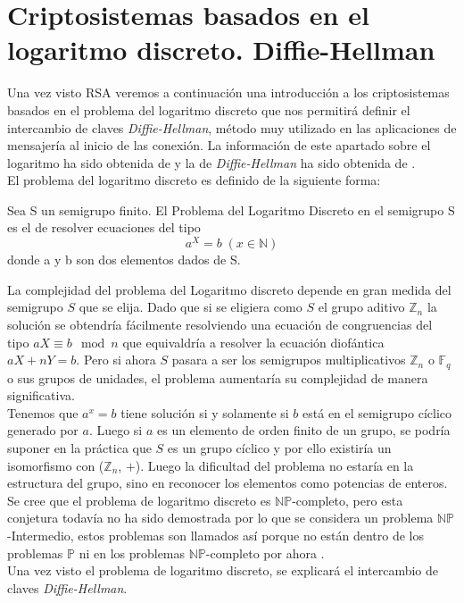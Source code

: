\section{Criptosistemas basados en el logaritmo discreto. Diffie-Hellman}
Una vez visto RSA veremos a continuación una introducción a los criptosistemas basados en el problema del logaritmo discreto que nos permitirá definir el intercambio de claves \emph{Diffie-Hellman}, método muy utilizado en las aplicaciones de mensajería al inicio de las conexión. La información de este apartado sobre el logaritmo ha sido obtenida de \cite{angelRiosMateos} y la de \emph{Diffie-Hellman} ha sido obtenida de \cite{En2011}.\\
El problema del logaritmo discreto es definido de la siguiente forma:
\begin{definicion}
	Sea S un semigrupo finito. El Problema del Logaritmo Discreto en el semigrupo S es el de resolver ecuaciones del tipo\\
		$$
			a^X\!=b\;(x\in \mathbb{N})
		$$
	donde a y b son dos elementos dados de S.
\end{definicion}

La complejidad del problema del Logaritmo discreto depende en gran medida del semigrupo $S$ que se elija.
Dado que si se eligiera como $S$ el grupo aditivo $\mathbb{Z}_n$ la solución se obtendría fácilmente resolviendo una ecuación de congruencias del tipo $aX \equiv b \mod n$ que equivaldría a resolver la ecuación diofántica $aX + nY = b$. Pero si ahora $S$ pasara a ser los semigrupos multiplicativos $\mathbb{Z}_n$ o $\mathbb{F}_q$ o sus grupos de unidades, el problema aumentaría su complejidad de manera significativa.\\
Tenemos que $a^x = b$ tiene solución si y solamente si $b$ está en el semigrupo cíclico generado por $a$. Luego si $a$ es un elemento de orden finito de un grupo, se podría suponer en la práctica que $S$ es un grupo cíclico y por ello existiría un isomorfismo con ($\mathbb{Z}_n$, $+$). Luego la dificultad del problema no estaría en la estructura del grupo, sino en reconocer los elementos como potencias de enteros.\\
Se cree que el problema de logaritmo discreto es $\mathbb{NP}$-completo, pero esta conjetura todavía no ha sido demostrada por lo que se considera un problema $\mathbb{NP}$-Intermedio, estos problemas son llamados así porque no están dentro de los problemas $\mathbb{P}$ ni en los problemas $\mathbb{NP}$-completo por ahora \cite{NP-intermedio}.\\
Una vez visto el problema de logaritmo discreto, se explicará el intercambio de claves \emph{Diffie-Hellman}.
